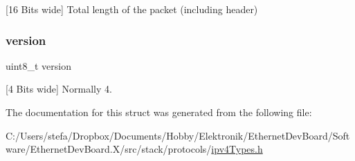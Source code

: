 \mbox{[}16 Bits wide\mbox{]} Total length of the packet (including header) 

\mbox{\label{structipv4__header_ab22abc2906422da61885ac6c8e6a1a59}} 
\subsubsection{\texorpdfstring{version}{version}}
{\footnotesize\ttfamily uint8\+\_\+t version}



\mbox{[}4 Bits wide\mbox{]} Normally 4. 



The documentation for this struct was generated from the following file\+:\begin{DoxyCompactItemize}
\item 
C\+:/\+Users/stefa/\+Dropbox/\+Documents/\+Hobby/\+Elektronik/\+Ethernet\+Dev\+Board/\+Software/\+Ethernet\+Dev\+Board.\+X/src/stack/protocols/\mbox{\hyperlink{ipv4_types_8h}{ipv4\+Types.\+h}}\end{DoxyCompactItemize}
